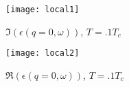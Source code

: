 \documentclass[../main.tex]{subfiles}
\begin{document}
	\begin{figure}[htp]
		\centering
		\texttt{[image: local1]}
		\caption{$\Im(\epsilon(q = 0, \omega))$, $T = .1 T_c$} \label{fig:loc1}
	\end{figure}
	\begin{figure}[htp]
		\centering
		\texttt{[image: local2]}
		\caption{$\Re(\epsilon(q = 0, \omega))$, $T = .1 T_c$} \label{fig:loc2}
	\end{figure}

\end{document}
